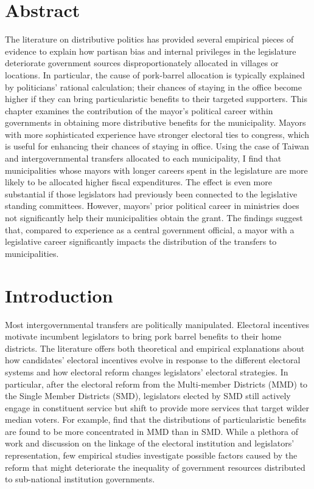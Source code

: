 \section*{\centering Abstract}

\small The literature on distributive politics has provided several empirical pieces of evidence to explain how partisan bias and internal privileges in the legislature deteriorate government sources disproportionately allocated in villages or locations. In particular, the cause of pork-barrel allocation is typically explained by politicians' rational calculation; their chances of staying in the office become higher if they can bring particularistic benefits to their targeted supporters. This chapter examines the contribution of the mayor's political career within governments in obtaining more distributive benefits for the municipality. Mayors with more sophisticated experience have stronger electoral ties to congress, which is useful for enhancing their chances of staying in office. Using the case of Taiwan and intergovernmental transfers allocated to each municipality, I find that municipalities whose mayors with longer careers spent in the legislature are more likely to be allocated higher fiscal expenditures. The effect is even more substantial if those legislators had previously been connected to the legislative standing committees. However, mayors' prior political career in ministries does not significantly help their municipalities obtain the grant. The findings suggest that, compared to experience as a central government official, a mayor with a legislative career significantly impacts the distribution of the transfers to municipalities.

\clearpage

\section*{\centering Introduction}
Most intergovernmental transfers are politically manipulated. Electoral incentives motivate incumbent legislators to bring pork barrel benefits to their home districts. The literature offers both theoretical and empirical explanations about how candidates' electoral incentives evolve in response to the different electoral systems \citep[][]{Myerson1993, Cox1990} and how electoral reform changes legislators' electoral strategies. In particular, after the electoral reform from the Multi-member Districts (MMD) to the Single Member Districts (SMD), legislators elected by SMD still actively engage in constituent service but shift to provide more services that target wilder median voters. For example, \citet[][]{Hirano2006, McKean2000} find that the distributions of particularistic benefits are found to be more concentrated in MMD than in SMD. While a plethora of work and discussion on the linkage of the electoral institution and legislators' representation, few empirical studies investigate possible factors caused by the reform that might deteriorate the inequality of government resources distributed to sub-national institution governments.

